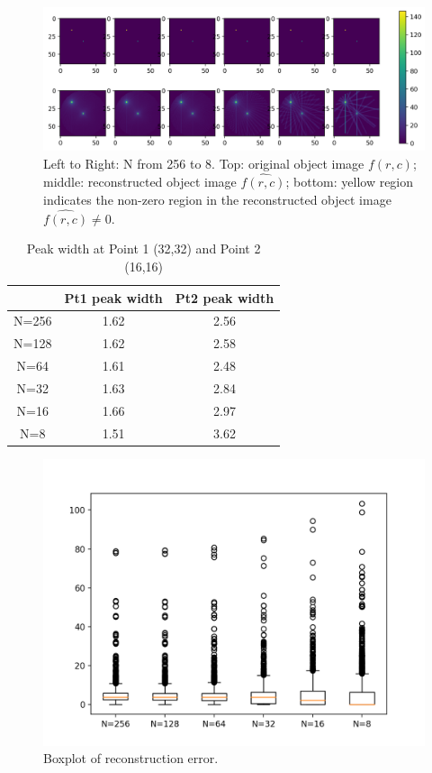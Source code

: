 \documentclass[11pt,a4paper]{article}
\begin{document}
\begin{figure}[!htp]
    \centering
    \includegraphics[width=\linewidth]{HW2_Q3_3.2.png}
    \caption{ Left to Right: N from 256 to 8.
        Top: original object image $f(r,c)$; middle: reconstructed object image $\widehat{f(r,c)}$; bottom: yellow region indicates the non-zero region in the reconstructed object image $\widehat{f(r,c)}\ne 0$.}
    \label{fig:recon}
\end{figure}

\begin{table}[!htp]
\centering
\begin{tabular}{c||c|c}
    \hline
     & Pt1 peak width & Pt2 peak width\\
    \hline
    N=256 & 1.62 & 2.56\\
    N=128 & 1.62 & 2.58\\
    N=64  & 1.61 & 2.48\\
    N=32  & 1.63 & 2.84\\
    N=16  & 1.66 & 2.97 \\
    N=8   & 1.51 & 3.62 \\
    \hline
\end{tabular}
\caption{Peak width at Point 1 (32,32) and Point 2 (16,16)}
\label{tab:err}
\end{table}

\begin{figure}[!htp]
    \centering
    \includegraphics[width=0.8\linewidth]{HW2_Q3_3.3.png}
    \caption{Boxplot of reconstruction error.}
    \label{fig:boxplot}
\end{figure}
\end{document}
